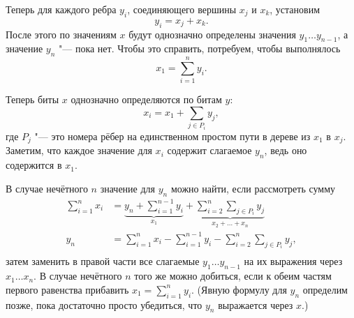 \documentclass[oneside, a4paper]{article}
\theoremstyle{plain}
\theoremstyle{remark}
\begin{document}
Теперь для каждого ребра $y_i$, соединяющего вершины $x_j$ и $x_k$, установим
\[
y_i = x_j + x_k.
\]
После этого по значениям $x$ будут однозначно определены значения $y_1 \dots
y_{n-1}$, а значение $y_n$ "--- пока нет. Чтобы это справить, потребуем, чтобы
выполнялось
\[
x_1 = \sum_{i = 1}^n y_i.
\]

Теперь биты $x$ однозначно определяются по битам $y$:
\[
x_i = x_1 + \sum_{j \in P_i} y_j,
\]
где $P_j$ "--- это номера рёбер на единственном простом пути в дереве из $x_1$ в
$x_j$. Заметим, что каждое значение для $x_i$ содержит слагаемое $y_n$, ведь оно
содержится в $x_1$.

В случае нечётного $n$ значение для $y_n$ можно найти, если рассмотреть сумму
\[
\begin{aligned}
\sum_{i=1}^n x_i &= \underbrace{y_n + \sum_{i=1}^{n-1} y_i}_{x_1} +
\underbrace{\sum_{i = 2}^n \sum_{j \in P_i} y_j}_{x_2 + \dots + x_n}
\\
y_n &= \sum_{i=1}^n x_i - \sum_{i = 1}^{n-1} y_i - \sum_{i = 2}^n \sum_{j \in P_i} y_j, \\
\end{aligned}
\]
затем заменить в правой части все слагаемые $y_1 \dots y_{n-1}$ на их выражения
через ${x_1 \dots x_n}$. В случае нечётного $n$ того же можно добиться, если
к обеим частям первого равенства прибавить $x_1 = \sum_{i=1}^n y_i$. (Явную
формулу для $y_n$ определим позже, пока достаточно просто убедиться, что $y_n$
выражается через $x$.)
\end{document}
